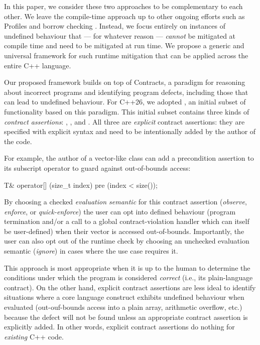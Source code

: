 In this paper, we consider these two approaches to be complementary to each other. We leave the compile-time approach up to other ongoing efforts such as Profiles \cite{P3081R2} and borrow checking \cite{P3390R0}. Instead, we focus entirely on instances of undefined behaviour that --- for whatever reason --- \emph{cannot} be mitigated at compile time and need to be mitigated at run time. We propose a generic and universal framework for such runtime mitigation that can be applied across the entire C++ language.

Our proposed framework builds on top of Contracts, a paradigm for reasoning about incorrect programs and identifying program defects, including those that can lead to undefined behaviour. For C++26, we adopted \cite{P2900R14}, an initial subset of functionality based on this paradigm. This initial subset contains three kinds of \emph{contract assertions}: , , and . All three are \emph{explicit} contract assertions: they are specified with explicit syntax and need to be intentionally added by the author of the code.

For example, the author of a vector-like class can add a precondition assertion to its subscript operator to guard against out-of-bounds access:

\begin{codeblock}
T& operator[] (size_t index)
  pre (index < size());
\end{codeblock}

By choosing a checked \emph{evaluation semantic} for this contract assertion (\emph{observe}, \emph{enforce}, or \emph{quick-enforce}) the user can opt into defined behaviour (program termination and/or a call to a global contract-violation handler which can itself be user-defined) when their vector is accessed out-of-bounds. Importantly, the user can also opt out of the runtime check by choosing an unchecked evaluation semantic (\emph{ignore}) in cases where the use case requires it.

This approach is most appropriate when it is up to the human to determine the conditions under which the program is considered \emph{correct} (i.e., its plain-language contract). On the other hand, explicit contract assertions are less ideal to identify situations where a core language construct exhibits undefined behaviour when evaluated (out-ouf-bounds access into a plain array, arithmetic overflow, etc.) because the defect will not be found unless an appropriate contract assertion is explicitly added. In other words, explicit contract assertions do nothing for \emph{existing} C++ code.


